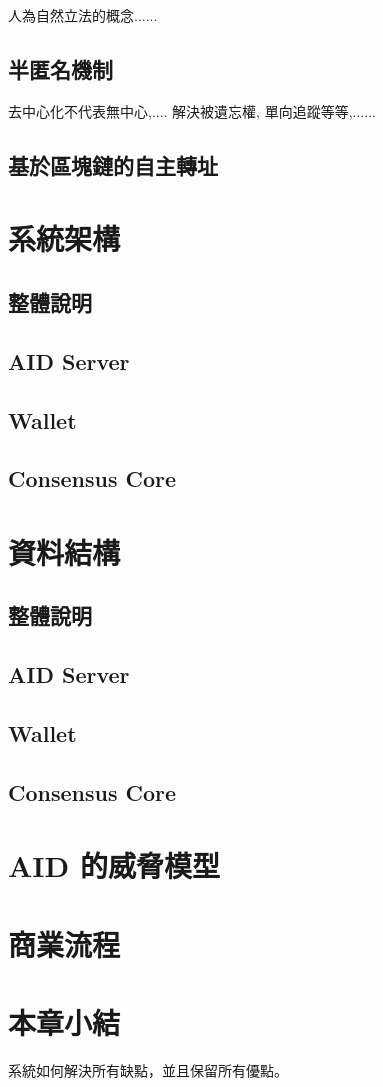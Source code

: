人為自然立法的概念......

\subsection{半匿名機制}

去中心化不代表無中心,.... 解決被遺忘權, 單向追蹤等等,......

\subsection{基於區塊鏈的自主轉址}

\section{系統架構}
\subsection{整體說明}
\subsection{AID Server}
\subsection{Wallet}
\subsection{Consensus Core}

\section{資料結構}
\subsection{整體說明}
\subsection{AID Server}
\subsection{Wallet}
\subsection{Consensus Core}

\section{AID 的威脅模型}

\section{商業流程}

\section{本章小結}

系統如何解決所有缺點，並且保留所有優點。